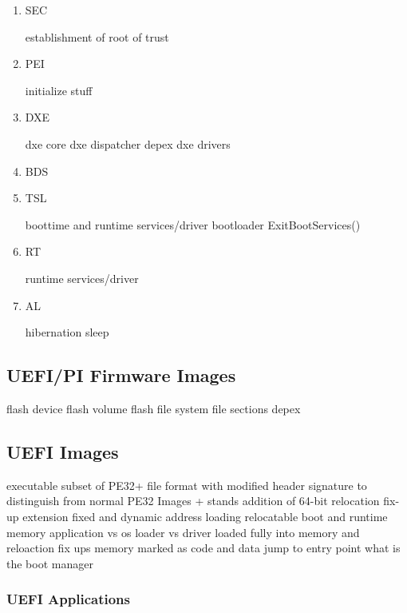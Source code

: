 \begin{enumerate}
    \item{\acf{SEC}}

    establishment of root of trust

    \item{\acf{PEI}}

    initialize stuff

    \item{\acf{DXE}}

    dxe core
    dxe dispatcher
    depex
    dxe drivers

    \item{\acf{BDS}}


    \item{\acf{TSL}}

    boottime and runtime services/driver
    bootloader
    ExitBootServices()

    \item{\acf{RT}}

    runtime services/driver

    \item{\acf{AL}}

    hibernation
    sleep

\end{enumerate}

\subsection{\acs{UEFI}/\acs{PI} Firmware Images}

flash device
flash volume
flash file system
file sections
depex

\subsection{\acs{UEFI} Images}

executable
subset of PE32+ file format with modified header signature to distinguish from normal PE32 Images
+ stands addition of 64-bit relocation fix-up extension
fixed and dynamic address loading
relocatable
boot and runtime memory
application vs os loader vs driver
loaded fully into memory and reloaction fix ups
memory marked as code and data
jump to entry point
what is the boot manager

\subsubsection{\acs{UEFI} Applications}

